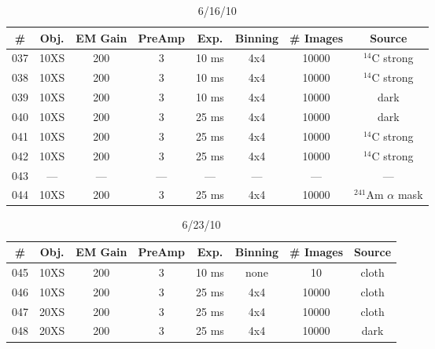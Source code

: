 \documentclass[12pt]{amsart}
\begin{document}
\begin{table}[!htbp]
	\centering
	\caption{6/16/10}
	\label{tab:table6}
	\hspace*{-1cm}
	\begin{tabular}{cccccccc}
		\toprule
		\# & Obj. & EM Gain & PreAmp & Exp. & Binning & \# Images & Source\\
		\midrule
		037 & 10XS & 200 & 3 & 10 ms & 4x4 & 10000 & $^{14}$C strong\\
		038 & 10XS & 200 & 3 & 10 ms & 4x4 & 10000 & $^{14}$C strong\\
		039 & 10XS & 200 & 3 & 10 ms & 4x4 & 10000 & dark\\
		040 & 10XS & 200 & 3 & 25 ms & 4x4 & 10000 & dark\\
		041 & 10XS & 200 & 3 & 25 ms & 4x4 & 10000 & $^{14}$C strong\\
		042 & 10XS & 200 & 3 & 25 ms & 4x4 & 10000 & $^{14}$C strong\\
		043 & --- & --- & --- & --- & --- & --- & ---\\
		044 & 10XS & 200 & 3 & 25 ms & 4x4 & 10000 & $^{241}$Am $\alpha$ mask\\
		\bottomrule
	\end{tabular}
	\hspace*{-1cm}
\end{table}

\begin{table}[!htbp]
	\centering
	\caption{6/23/10}
	\label{tab:table7}
	\hspace*{-1cm}
	\begin{tabular}{cccccccc}
		\toprule
		\# & Obj. & EM Gain & PreAmp & Exp. & Binning & \# Images & Source\\
		\midrule
		045 & 10XS & 200 & 3 & 10 ms & none & 10 & cloth\\
		046 & 10XS & 200 & 3 & 25 ms & 4x4 & 10000 & cloth\\
		047 & 20XS & 200 & 3 & 25 ms & 4x4 & 10000 & cloth\\
		048 & 20XS & 200 & 3 & 25 ms & 4x4 & 10000 & dark\\
		\bottomrule
	\end{tabular}
	\hspace*{-1cm}
\end{table}
\end{document}
